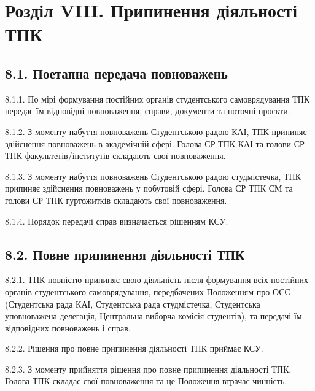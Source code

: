 \section*{Розділ VIII. Припинення діяльності ТПК}

\subsection*{8.1. Поетапна передача повноважень}
    8.1.1. По мірі формування постійних органів студентського самоврядування ТПК передає їм відповідні повноваження, справи, документи та поточні проєкти.

    8.1.2. З моменту набуття повноважень Студентською радою КАІ, ТПК припиняє здійснення повноважень в академічній сфері. Голова СР ТПК КАІ та голови СР ТПК факультетів/інститутів складають свої повноваження.

    8.1.3. З моменту набуття повноважень Студентською радою студмістечка, ТПК припиняє здійснення повноважень у побутовій сфері. Голова СР ТПК СМ та голови СР ТПК гуртожитків складають свої повноваження.

    8.1.4. Порядок передачі справ визначається рішенням КСУ.

\subsection*{8.2. Повне припинення діяльності ТПК}
    8.2.1. ТПК повністю припиняє свою діяльність після формування всіх постійних органів студентського самоврядування, передбачених Положенням про ОСС (Студентська рада КАІ, Студентська рада студмістечка, Студентська уповноважена делегація, Центральна виборча комісія студентів), та передачі їм відповідних повноважень і справ.

    8.2.2. Рішення про повне припинення діяльності ТПК приймає КСУ.

    8.2.3. З моменту прийняття рішення про повне припинення діяльності ТПК, Голова ТПК складає свої повноваження та це Положення втрачає чинність.
